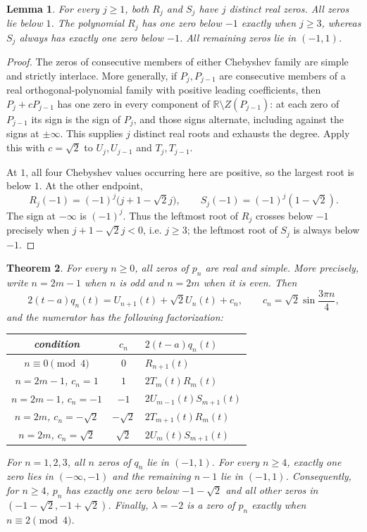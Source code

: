 \documentclass[11pt]{article}
\newtheorem{theorem}{Theorem}
\newtheorem{lemma}[theorem]{Lemma}
\newcommand{\R}{\mathbb R}
\newcommand{\rt}{\sqrt2}
\begin{document}
\begin{lemma}\label{lem:combination}
For every $j\geq1$, both $R_j$ and $S_j$ have $j$ distinct real zeros.
All zeros lie below $1$.  The polynomial $R_j$ has one zero below $-1$
exactly when $j\geq3$, whereas $S_j$ always has exactly one zero below $-1$.
All remaining zeros lie in $(-1,1)$.
\end{lemma}

\begin{proof}
The zeros of consecutive members of either Chebyshev family are simple and
strictly interlace.  More generally, if $P_j,P_{j-1}$ are consecutive
members of a real orthogonal-polynomial family with positive leading
coefficients, then $P_j+cP_{j-1}$ has one zero in every component of
$\R\setminus Z(P_{j-1})$: at each zero of $P_{j-1}$ its sign is the sign of
$P_j$, and those signs alternate, including against the signs at
$\pm\infty$.  This supplies $j$ distinct real roots and exhausts the degree.
Apply this with $c=\rt$ to $U_j,U_{j-1}$ and $T_j,T_{j-1}$.

At $1$, all four Chebyshev values occurring here are positive, so the largest
root is below $1$.  At the other endpoint,
\[
 R_j(-1)=(-1)^j\bigl(j+1-\rt j\bigr),\qquad
 S_j(-1)=(-1)^j(1-\rt).
\]
The sign at $-\infty$ is $(-1)^j$.  Thus the leftmost root of $R_j$
crosses below $-1$ precisely when $j+1-\rt j<0$, i.e. $j\geq3$; the
leftmost root of $S_j$ is always below $-1$.
\end{proof}

\begin{theorem}\label{thm:main}
For every $n\geq0$, all zeros of $p_n$ are real and simple.  More precisely,
write $n=2m-1$ when $n$ is odd and $n=2m$ when it is even.  Then
\begin{equation}\label{eq:numerator}
 2(t-a)q_n(t)=U_{n+1}(t)+\rt U_n(t)+c_n,
 \qquad c_n=\rt\sin\frac{3\pi n}{4},
\end{equation}
and the numerator has the following factorization:
\begin{center}
\begin{tabular}{ccl}
\toprule
condition & $c_n$ & $2(t-a)q_n(t)$ \\
\midrule
$n\equiv0\pmod4$ & $0$ & $R_{n+1}(t)$ \\
$n=2m-1$, $c_n=1$ & $1$ & $2T_m(t)R_m(t)$ \\
$n=2m-1$, $c_n=-1$ & $-1$ & $2U_{m-1}(t)S_{m+1}(t)$ \\
$n=2m$, $c_n=-\rt$ & $-\rt$ & $2T_{m+1}(t)R_m(t)$ \\
$n=2m$, $c_n=\rt$ & $\rt$ & $2U_m(t)S_{m+1}(t)$ \\
\bottomrule
\end{tabular}
\end{center}
For $n=1,2,3$, all $n$ zeros of $q_n$ lie in $(-1,1)$.  For every
$n\geq4$, exactly one zero lies in $(-\infty,-1)$ and the remaining $n-1$
lie in $(-1,1)$.  Consequently, for $n\geq4$, $p_n$ has exactly one zero
below $-1-\rt$ and all other zeros in $(-1-\rt,-1+\rt)$.  Finally,
$\lambda=-2$ is a zero of $p_n$ exactly when $n\equiv2\pmod4$.
\end{theorem}
\end{document}
